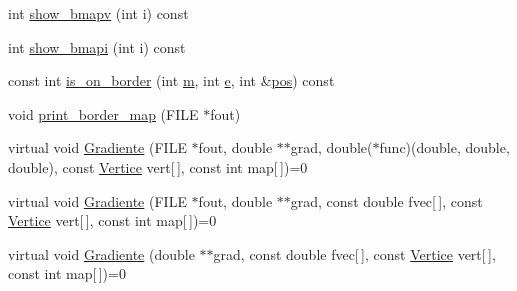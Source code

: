 \begin{DoxyCompactItemize}
\item 
int \hyperlink{classStdel_ac8787dabfb1d767b89e39806522c1161}{show\+\_\+bmapv} (int i) const
\item 
int \hyperlink{classStdel_ad3a0646ad7ec2567e46da36285dee331}{show\+\_\+bmapi} (int i) const
\item 
const int \hyperlink{classStdel_abb022f0ad81707e11e3a3091d2d87c46}{is\+\_\+on\+\_\+border} (int \hyperlink{DG__EI__Header_8h_a742204794ea328ba293fe59cec79b990}{m}, int \hyperlink{DG__EI__Header_8h_ab1ff01ebd410ddf016a3c7bbe9d98944}{e}, int \&\hyperlink{DG__EI__Header_8h_a1910d262855b71da353ed0d07a6c7823}{pos}) const
\item 
void \hyperlink{classStdel_a9a0c69dca7564f6ca4aa4f3c9864ea01}{print\+\_\+border\+\_\+map} (F\+I\+LE $\ast$fout)
\item 
virtual void \hyperlink{classStdel_af3e65d1ad0d59ded925a3f5a9d0fb100}{Gradiente} (F\+I\+LE $\ast$fout, double $\ast$$\ast$grad, double($\ast$func)(double, double, double), const \hyperlink{structVertice}{Vertice} vert\mbox{[}$\,$\mbox{]}, const int map\mbox{[}$\,$\mbox{]})=0
\item 
virtual void \hyperlink{classStdel_abf44e457d99e8c559c14cb1f7423da12}{Gradiente} (F\+I\+LE $\ast$fout, double $\ast$$\ast$grad, const double fvec\mbox{[}$\,$\mbox{]}, const \hyperlink{structVertice}{Vertice} vert\mbox{[}$\,$\mbox{]}, const int map\mbox{[}$\,$\mbox{]})=0
\item 
virtual void \hyperlink{classStdel_aec200dfb0b00bebf70a1d845675eeafd}{Gradiente} (double $\ast$$\ast$grad, const double fvec\mbox{[}$\,$\mbox{]}, const \hyperlink{structVertice}{Vertice} vert\mbox{[}$\,$\mbox{]}, const int map\mbox{[}$\,$\mbox{]})=0
\end{DoxyCompactItemize}
